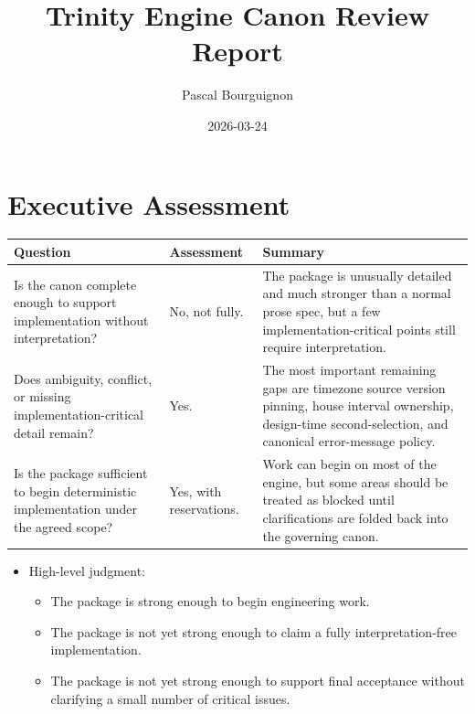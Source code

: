 \documentclass[11pt]{article}
\author{Pascal Bourguignon}
\date{2026-03-24}
\title{Trinity Engine Canon Review Report}
\begin{document}
\maketitle
\tableofcontents

\section{Executive Assessment}
\label{sec:orgb615176}
\begin{center}
\begin{tabular}{lll}
Question & Assessment & Summary\\
\hline
Is the canon complete enough to support implementation without interpretation? & No, not fully. & The package is unusually detailed and much stronger than a normal prose spec, but a few implementation-critical points still require interpretation.\\
Does ambiguity, conflict, or missing implementation-critical detail remain? & Yes. & The most important remaining gaps are timezone source version pinning, house interval ownership, design-time second-selection, and canonical error-message policy.\\
Is the package sufficient to begin deterministic implementation under the agreed scope? & Yes, with reservations. & Work can begin on most of the engine, but some areas should be treated as blocked until clarifications are folded back into the governing canon.\\
\end{tabular}
\end{center}

\begin{itemize}
\item High-level judgment:
\begin{itemize}
\item The package is strong enough to begin engineering work.
\item The package is not yet strong enough to claim a fully interpretation-free implementation.
\item The package is not yet strong enough to support final acceptance without clarifying a small number of critical issues.
\end{itemize}
\end{itemize}
\end{document}
